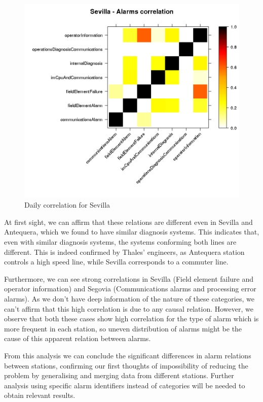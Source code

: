 \documentclass[a4paper,12pt]{article}
\begin{document}
\begin{figure}[htb]
 \centering
 \includegraphics[width=\textwidth]{./img/sevilla_corr.png}
 \caption{Daily correlation for Sevilla} \label{fig:sevilla_corr}
\end{figure}

\clearpage

At first sight, we can affirm that these relations are different even in Sevilla and Antequera, which we found to have similar diagnosis systems. This indicates that, even with similar diagnosis systems, the systems conforming both lines are different. This is indeed confirmed by Thales' engineers, as Antequera station controls a high speed line, while Sevilla corresponds to a commuter line.

Furthermore, we can see strong correlations in Sevilla (Field element failure and operator information) and Segovia (Communications alarms and processing error alarms). As we don't have deep information of the nature of these categories, we can't affirm that this high correlation is due to any causal relation. However, we observe that both these cases show high correlation for the type of alarm which is more frequent in each station, so uneven distribution of alarms might be the cause of this apparent relation between alarms.

From this analysis we can conclude the significant differences in alarm relations between stations, confirming our first thoughts of impossibility of reducing the problem by generalising and merging data from different stations. Further analysis using specific alarm identifiers instead of categories will be needed to obtain relevant results.
\end{document}
